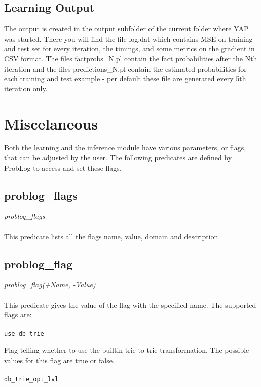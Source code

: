 \documentclass[a4paper,12pt]{article}
\begin{document}
\subsection{Learning Output}

The output is created in the output subfolder of the current folder where YAP was started. There you will find the file log.dat which contains MSE on training and test set for every iteration, the timings, and some metrics on the gradient in CSV format. The files factprobs\_N.pl contain the fact probabilities after the Nth iteration and the files predictions\_N.pl contain the estimated probabilities for each training and test example - per default these file are generated every 5th iteration only.

\section{Miscelaneous}

Both the learning and the inference module have various parameters, or flags, that can be adjusted by the user.
The following predicates are defined by ProbLog to access and set these flags.

\subsection{problog\_flags}
\textit{problog\_flags}
\paragraph{}
This predicate lists all the flags name, value, domain and description.


\subsection{problog\_flag}
\textit{problog\_flag(+Name, -Value)}
\paragraph{}
This predicate gives the value of the flag with the specified name. The supported flags are:
\paragraph{}
\texttt{use\_db\_trie}

Flag telling whether to use the builtin trie to trie transformation. 
The possible values for this flag are true or false. 
\paragraph{}
\texttt{db\_trie\_opt\_lvl}
\end{document}
